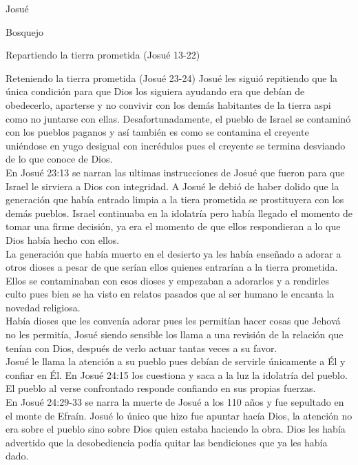 \begin{section}{Josué}
\begin{subsection}{Bosquejo}
\begin{subsubsection}{Repartiendo la tierra prometida (Josué 13-22)}
	\end{subsubsection}
	\begin{subsubsection}{Reteniendo la tierra prometida (Josué 23-24)}
		Josué les siguió repitiendo que la única condición para que Dios los siguiera ayudando era que debían de obedecerlo, aparterse y no convivir con los demás habitantes de la tierra aspi como no juntarse con ellas. Desafortunadamente, el pueblo de Israel se contaminó con los pueblos paganos y así también es como se contamina el creyente uniéndose en yugo desigual con incrédulos pues el creyente se termina desviando de lo que conoce de Dios.\\
		En Josué 23:13 se narran las ultimas instrucciones de Josué que fueron para que Israel le sirviera a Dios con integridad. A Josué le debió de haber dolido que la generación que había entrado limpia a la tiera prometida se prostituyera con los demás pueblos. Israel continuaba en la idolatría pero había llegado el momento de tomar una firme  decisión, ya era el momento de que ellos respondieran a lo que Dios había hecho con ellos.\\
		La generación que había muerto en el desierto ya les había enseñado a adorar a otros dioses a pesar de que serían ellos quienes entrarían a la tierra prometida. Ellos se contaminaban con esos dioses y empezaban a adorarlos y a rendirles culto pues bien se ha visto en relatos pasados que al ser humano le encanta la novedad religiosa.\\
		Había dioses que les convenía adorar pues les permitían hacer cosas que Jehová no les permitía, Josué siendo sensible los llama a una revisión de la relación que tenían con Dios, después de verlo actuar tantas veces a su favor.\\
		Josué le llama la atención a su pueblo pues debían de servirle únicamente a Él y confiar en Él. En Josué 24:15 los cuestiona y saca a la luz la idolatría del pueblo. El pueblo al verse confrontado responde confiando en sus propias fuerzas.\\
		En Josué 24:29-33 se narra la muerte de Josué a los 110 años y fue sepultado en el monte de Efraín. Josué lo único que hizo fue apuntar hacía Dios, la atención no era sobre el pueblo sino sobre Dios quien estaba haciendo la obra. Dios les había advertido que la desobediencia podía quitar las bendiciones que ya les había dado.
	\end{subsubsection}
\end{subsection}
\end{section}
%


